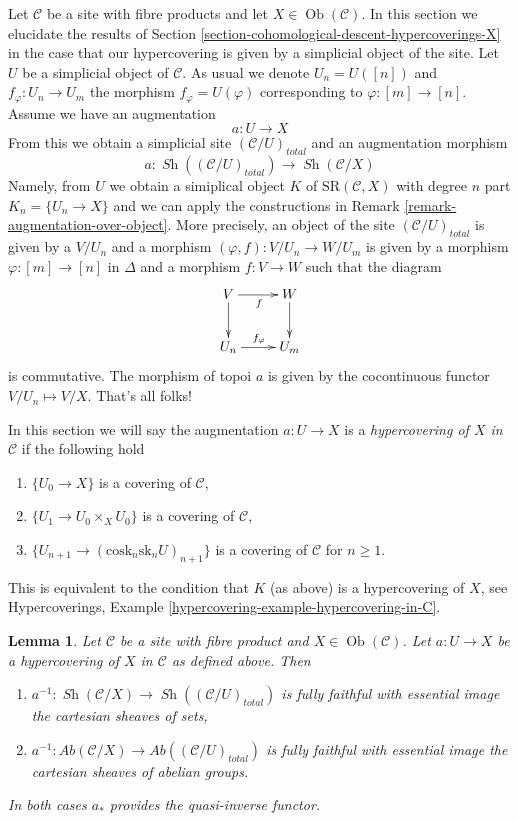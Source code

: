 \documentclass{stacks-project}
\theoremstyle{plain}
\newtheorem{lemma}[subsection]{Lemma}
\theoremstyle{definition}
\theoremstyle{remark}
\numberwithin{equation}{subsection}
\def\Ob{\mathop{\mathrm{Ob}}\nolimits}
\def\Sh{\mathop{\mathit{Sh}}\nolimits}
\begin{document}
\noindent
Let $\mathcal{C}$ be a site with fibre products and
let $X \in \Ob(\mathcal{C})$.
In this section we elucidate the results of
Section \ref{section-cohomological-descent-hypercoverings-X}
in the case that our hypercovering is given by
a simplicial object of the site.
Let $U$ be a simplicial object of $\mathcal{C}$.
As usual we denote $U_n = U([n])$ and $f_\varphi : U_n \to U_m$
the morphism $f_\varphi = U(\varphi)$ corresponding to
$\varphi : [m] \to [n]$.
Assume we have an augmentation
$$
a : U \to X
$$
From this we obtain a simplicial site $(\mathcal{C}/U)_{total}$
and an augmentation morphism
$$
a : \Sh((\mathcal{C}/U)_{total}) \longrightarrow \Sh(\mathcal{C}/X)
$$
Namely, from $U$ we obtain a simiplical object $K$ of
$\text{SR}(\mathcal{C}, X)$ with degree $n$ part
$K_n = \{U_n \to X\}$ and we can apply the constructions in
Remark \ref{remark-augmentation-over-object}.
More precisely, an object of the site $(\mathcal{C}/U)_{total}$ is given by
a $V/U_n$ and a morphism $(\varphi, f) : V/U_n \to W/U_m$ is given
by a morphism $\varphi : [m] \to [n]$ in $\Delta$ and a morphism
$f : V \to W$ such that the diagram
$$
\xymatrix{
V \ar[r]_f \ar[d] & W \ar[d] \\
U_n \ar[r]^{f_\varphi} & U_m
}
$$
is commutative. The morphism of topoi $a$ is given by the cocontinuous
functor $V/U_n \mapsto V/X$. That's all folks!

\medskip\noindent
In this section we will say the augmentation $a : U \to X$ is a
{\it hypercovering of $X$ in $\mathcal{C}$} if the following hold
\begin{enumerate}
\item $\{U_0 \to X\}$ is a covering of $\mathcal{C}$,
\item $\{U_1 \to U_0 \times_X U_0\}$ is a covering of $\mathcal{C}$,
\item $\{U_{n + 1} \to (\text{cosk}_n\text{sk}_n U)_{n + 1}\}$
is a covering of $\mathcal{C}$ for $n \geq 1$.
\end{enumerate}
This is equivalent to the condition that $K$ (as above) is a hypercovering
of $X$, see
Hypercoverings, Example \ref{hypercovering-example-hypercovering-in-C}.

\begin{lemma}
\label{lemma-hypercovering-X-simple-descent-sheaves}
Let $\mathcal{C}$ be a site with fibre product and $X \in \Ob(\mathcal{C})$.
Let $a : U \to X$ be a hypercovering of $X$ in $\mathcal{C}$ as defined above.
Then
\begin{enumerate}
\item $a^{-1} : \Sh(\mathcal{C}/X) \to \Sh((\mathcal{C}/U)_{total})$
is fully faithful with essential image the cartesian sheaves of sets,
\item $a^{-1} : \textit{Ab}(\mathcal{C}/X) \to
\textit{Ab}((\mathcal{C}/U)_{total})$
is fully faithful with essential image the cartesian sheaves
of abelian groups.
\end{enumerate}
In both cases $a_*$ provides the quasi-inverse functor.
\end{lemma}
\end{document}
